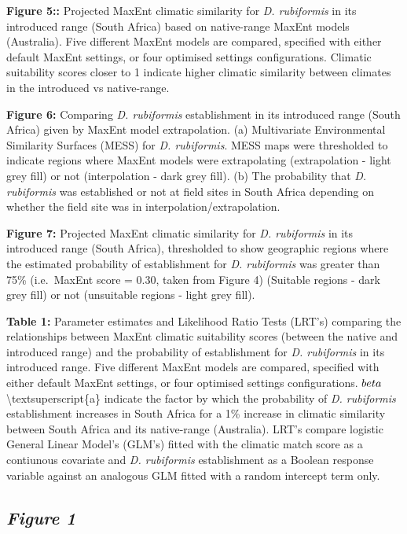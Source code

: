 \documentclass[12pt,]{article}
\begin{document}
\textbf{Figure 5::} Projected MaxEnt climatic similarity for \emph{D.
rubiformis} in its introduced range (South Africa) based on native-range
MaxEnt models (Australia). Five different MaxEnt models are compared,
specified with either default MaxEnt settings, or four optimised
settings configurations. Climatic suitability scores closer to 1
indicate higher climatic similarity between climates in the introduced
vs native-range.

\textbf{Figure 6:} Comparing \emph{D. rubiformis} establishment in its
introduced range (South Africa) given by MaxEnt model extrapolation. (a)
Multivariate Environmental Similarity Surfaces (MESS) for \emph{D.
rubiformis}. MESS maps were thresholded to indicate regions where MaxEnt
models were extrapolating (extrapolation - light grey fill) or not
(interpolation - dark grey fill). (b) The probability that \emph{D.
rubiformis} was established or not at field sites in South Africa
depending on whether the field site was in interpolation/extrapolation.

\textbf{Figure 7:} Projected MaxEnt climatic similarity for \emph{D.
rubiformis} in its introduced range (South Africa), thresholded to show
geographic regions where the estimated probability of establishment for
\emph{D. rubiformis} was greater than 75\% (i.e.~MaxEnt score = 0.30,
taken from Figure 4) (Suitable regions - dark grey fill) or not
(unsuitable regions - light grey fill).

\textbf{Table 1:} Parameter estimates and Likelihood Ratio Tests (LRT's)
comparing the relationships between MaxEnt climatic suitability scores
(between the native and introduced range) and the probability of
establishment for \emph{D. rubiformis} in its introduced range. Five
different MaxEnt models are compared, specified with either default
MaxEnt settings, or four optimised settings configurations.
\(\\beta\)\textbackslash textsuperscript\{a\} indicate the factor by
which the probability of \emph{D. rubiformis} establishment increases in
South Africa for a 1\% increase in climatic similarity between South
Africa and its native-range (Australia). LRT's compare logistic General
Linear Model's (GLM's) fitted with the climatic match score as a
contiunous covariate and \emph{D. rubiformis} establishment as a Boolean
response variable against an analogous GLM fitted with a random
intercept term only.

\newpage

\hypertarget{figure-1}{%
\subsection{\texorpdfstring{\emph{Figure 1}}{Figure 1}}\label{figure-1}}
\end{document}
